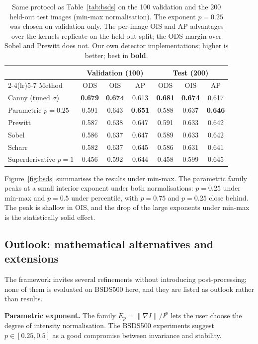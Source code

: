 \documentclass[conference]{IEEEtran}
\begin{document}
\begin{table}[!t]
\centering
\footnotesize
\caption{Same protocol as Table~\ref{tab:bsds} on the 100 validation and the 200
held-out test images (min-max normalisation).  The exponent $p=0.25$ was chosen on
validation only.  The per-image OIS and AP advantages over the kernels replicate on
the held-out split; the ODS margin over Sobel and Prewitt does not.  Our own detector
implementations; higher is better; best in \textbf{bold}.}
\label{tab:bsds_test}
\setlength{\tabcolsep}{3pt}
\begin{tabular}{@{}lcccccc@{}}
\toprule
& \multicolumn{3}{c}{Validation (100)} & \multicolumn{3}{c}{Test (200)} \\
\cmidrule(lr){2-4}\cmidrule(lr){5-7}
Method & ODS & OIS & AP & ODS & OIS & AP \\
\midrule
Canny (tuned $\sigma$)   & \textbf{0.679} & \textbf{0.674} & 0.613 & \textbf{0.681} & \textbf{0.674} & 0.617 \\
Parametric $p=0.25$       & 0.591 & 0.643 & \textbf{0.651} & 0.588 & 0.637 & \textbf{0.646} \\
Prewitt                   & 0.587 & 0.638 & 0.647 & 0.591 & 0.633 & 0.642 \\
Sobel                     & 0.586 & 0.637 & 0.647 & 0.589 & 0.633 & 0.642 \\
Scharr                    & 0.582 & 0.637 & 0.645 & 0.586 & 0.631 & 0.641 \\
Superderivative $p=1$      & 0.456 & 0.592 & 0.644 & 0.458 & 0.599 & 0.645 \\
\bottomrule
\end{tabular}
\end{table}

Figure~\ref{fig:bsds} summarises the results under min-max.  The parametric
family peaks at a small interior exponent under both normalisations: $p=0.25$ under
min-max and $p=0.5$ under percentile, with $p=0.75$ and $p=0.25$ close behind.
The peak is shallow in OIS, and the drop of the large exponents under min-max is
the statistically solid effect.

\subsection{Outlook: mathematical alternatives and extensions}
The framework invites several refinements without introducing post-processing;
none of them is evaluated on BSDS500 here, and they are listed as outlook rather
than results.

\textbf{Parametric exponent.} The family $E_p=\|\nabla I\|/I^p$ lets the
user choose the degree of intensity normalisation.  The BSDS500 experiments
suggest $p\in[0.25,0.5]$ as a good compromise between invariance and
stability.
\end{document}
